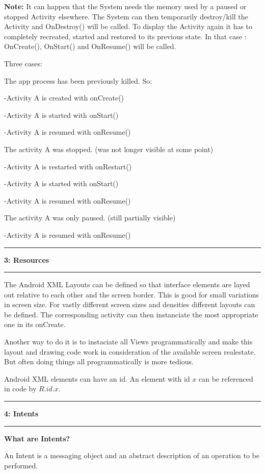 \documentclass[11pt]{article}
\newcommand\question[2]{\vspace{.25in}\hrule\textbf{#1: #2}\vspace{.5em}\hrule\vspace{.10in}}
\begin{document}
\textbf{Note:} It can happen that the System needs the memory used by a paused or stopped Activity elsewhere.\newline
	The System can then temporarily destroy/kill the Activity and OnDestroy() will be called. \newline
	To display the Activity again it has to completely recreated, started and restored to its previous state. \newline
	In that case : OnCreate(), OnStart() and OnResume() will be called. \newline
	
	
Three cases:

The app process has been previously killed. So:

-Activity A is created with onCreate()

-Activity A is started with onStart()

-Activity A is resumed with onResume()

The activity A was stopped. (was not longer visible at some point)

-Activity A is restarted with onRestart()

-Activity A is started with onStart()

-Activity A is resumed with onResume()

The activity A was only paused. (still partially visible)

-Activity A is resumed with onResume()


\question{3}{Resources}

The Android XML Layouts can be defined so that interface elements are layed out relative to each other and the screen border. This is good for small variations in screen size. For vastly different screen sizes and densities different layouts can be defined. The corresponding activity can then instanciate the most appropriate one in its onCreate.

Another way to do it is to instaciate all Views programmatically and make this layout and drawing code work in consideration of the available screen realestate. But often doing things all programmatically is more tedious.

Android XML elements can have an id. An element with id $x$ can be referenced in code by $R.id.x$.

\question{4}{Intents} 

\textbf {What are Intents?}

An Intent is a messaging object and an abstract description of an operation to be performed.
\end{document}
